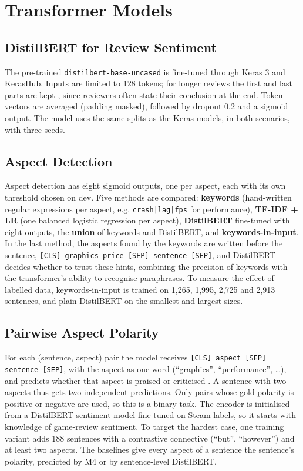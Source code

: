 \section{Transformer Models}

\subsection{DistilBERT for Review Sentiment}

The pre-trained \texttt{distilbert-base-uncased} \cite{Sanh2019} is fine-tuned through Keras 3 and KerasHub. Inputs are limited to 128 tokens; for longer reviews the first and last parts are kept \cite{SunFinetune2019}, since reviewers often state their conclusion at the end. Token vectors are averaged (padding masked), followed by dropout 0.2 and a sigmoid output. The model uses the same splits as the Keras models, in both scenarios, with three seeds.

\subsection{Aspect Detection}

Aspect detection has eight sigmoid outputs, one per aspect, each with its own threshold chosen on dev. Five methods are compared: \textbf{keywords} (hand-written regular expressions per aspect, e.g. \texttt{crash|lag|fps} for performance), \textbf{TF-IDF + LR} (one balanced logistic regression per aspect), \textbf{DistilBERT} fine-tuned with eight outputs, the \textbf{union} of keywords and DistilBERT, and \textbf{keywords-in-input}. In the last method, the aspects found by the keywords are written before the sentence, \texttt{[CLS] graphics price [SEP] sentence [SEP]}, and DistilBERT decides whether to trust these hints, combining the precision of keywords with the transformer's ability to recognise paraphrases.
To measure the effect of labelled data, keywords-in-input is trained on 1,265, 1,995, 2,725 and 2,913 sentences, and plain DistilBERT on the smallest and largest sizes.

\subsection{Pairwise Aspect Polarity}

For each (sentence, aspect) pair the model receives \texttt{[CLS] aspect [SEP] sentence [SEP]}, with the aspect as one word (``graphics'', ``performance'', \ldots), and predicts whether that aspect is praised or criticised \cite{SunABSA2019}. A sentence with two aspects thus gets two independent predictions. Only pairs whose gold polarity is positive or negative are used, so this is a binary task. The encoder is initialised from a DistilBERT sentiment model fine-tuned on Steam labels, so it starts with knowledge of game-review sentiment. To target the hardest case, one training variant adds 188 sentences with a contrastive connective (``but'', ``however'') and at least two aspects. The baselines give every aspect of a sentence the sentence's polarity, predicted by M4 or by sentence-level DistilBERT.

